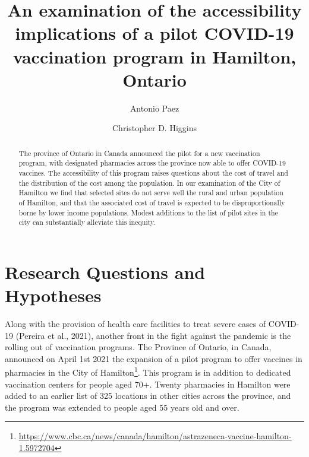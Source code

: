 \documentclass[]{elsarticle} %
\begin{document}
\begin{frontmatter}

  \title{An examination of the accessibility implications of a pilot COVID-19
vaccination program in Hamilton, Ontario}
    \author[McMaster University]{Antonio Paez}
    \author[University of Toronto Scarborough]{Christopher D. Higgins}
      \address[McMaster University]{School of Earth, Environment and Society, McMaster University, Hamilton,
ON, L8S 4K1, Canada}
    \address[University of Toronto Scarborough]{Department of Geography \& Planning, University of Toronto Scarborough,
1265 Military Trail, Toronto, ON M1C1A4}
  
  \begin{abstract}
  The province of Ontario in Canada announced the pilot for a new
  vaccination program, with designated pharmacies across the province now
  able to offer COVID-19 vaccines. The accessibility of this program
  raises questions about the cost of travel and the distribution of the
  cost among the population. In our examination of the City of Hamilton we
  find that selected sites do not serve well the rural and urban
  population of Hamilton, and that the associated cost of travel is
  expected to be disproportionally borne by lower income populations.
  Modest additions to the list of pilot sites in the city can
  substantially alleviate this inequity.
  \end{abstract}
  
 \end{frontmatter}

\hypertarget{research-questions-and-hypotheses}{%
\section{Research Questions and
Hypotheses}\label{research-questions-and-hypotheses}}

Along with the provision of health care facilities to treat severe cases
of COVID-19 (Pereira et al., 2021), another front in the fight against
the pandemic is the rolling out of vaccination programs. The Province of
Ontario, in Canada, announced on April 1st 2021 the expansion of a pilot
program to offer vaccines in pharmacies in the City of
Hamilton\footnote{\url{https://www.cbc.ca/news/canada/hamilton/astrazeneca-vaccine-hamilton-1.5972704}}.
This program is in addition to dedicated vaccination centers for people
aged 70+. Twenty pharmacies in Hamilton were added to an earlier list of
325 locations in other cities across the province, and the program was
extended to people aged 55 years old and over.
\end{document}
